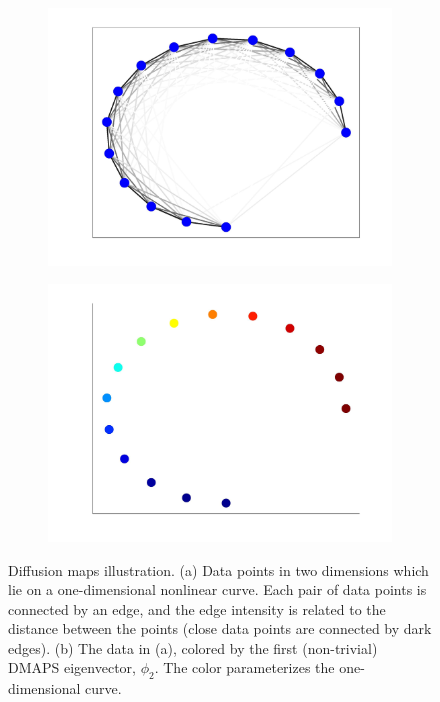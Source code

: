\documentclass{pnastwo}
\begin{document}
\begin{figure}
\begin{subfigure}{0.25\textwidth}
\includegraphics[width=\textwidth]{dmaps_schematic_edges}
\caption{}
\label{subfig:dmaps_edges}
\end{subfigure}
\begin{subfigure}{0.25\textwidth}
\includegraphics[width=\textwidth]{dmaps_schematic_color}
\caption{}
\label{subfig:dmaps_color}
\end{subfigure}
\caption{Diffusion maps illustration. (a) Data points in two dimensions which lie on a one-dimensional nonlinear curve. Each pair of data points is connected by an edge, and the edge intensity is related to the distance between the points (close data points are connected by dark edges). (b) The data in (a), colored by the first (non-trivial) DMAPS eigenvector, $\phi_2$. The color parameterizes the one-dimensional curve. }
\label{fig:dmaps_schematic}
\end{figure}
\end{document}

